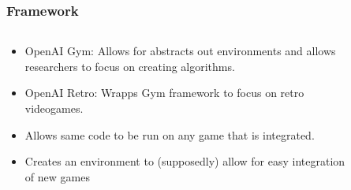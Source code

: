 \documentclass[pdf,8pt]{beamer}
\begin{document}
\begin{frame}
\frametitle{Framework}
\begin{columns}

\begin{column}{0.49\paperwidth}
\begin{itemize}
\item OpenAI Gym: Allows for abstracts out environments and allows researchers
to focus on creating algorithms.
\item OpenAI Retro: Wrapps Gym framework to focus on retro videogames.
\item Allows same code to be run on any game that is integrated.
\item Creates an environment to (supposedly) allow for easy integration of new
games
\end{itemize}
\end{column}

\begin{column}{0.49\paperwidth}
\begin{figure}
\end{figure}
\end{column}
\end{columns}
\end{frame}
\end{document}
